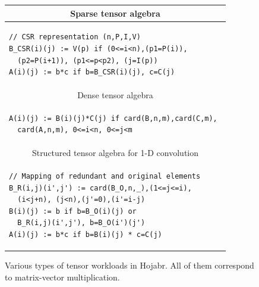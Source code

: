 \begin{figure}[t!]
\begin{tabular}{|l|}
\hline 
\multicolumn{1}{|c|}{Sparse tensor algebra} \\ \hline \hline
\begin{lstlisting}
// CSR representation (n,P,I,V)
B_CSR(i)(j) := V(p) if (0<=i<n),(p1=P(i)),
  (p2=P(i+1)), (p1<=p<p2), (j=I(p))
A(i)(j) := b*c if b=B_CSR(i)(j), c=C(j)
\end{lstlisting} \\ \hline \hline \hline
\multicolumn{1}{|c|}{Dense tensor algebra} \\ \hline \hline
\begin{lstlisting}
A(i)(j) := B(i)(j)*C(j) if card(B,n,m),card(C,m), 
  card(A,n,m), 0<=i<n, 0<=j<m
\end{lstlisting} \\ \hline \hline \hline
\multicolumn{1}{|c|}{Structured tensor algebra for 1-D convolution} \\ \hline \hline
\begin{lstlisting}
// Mapping of redundant and original elements 
B_R(i,j)(i',j') := card(B_O,n,_),(1<=j<=i), 
  (i<j+n), (j<n),(j'=0),(i'=i-j)
B(i)(j) := b if b=B_O(i)(j) or 
  B_R(i,j)(i',j'), b=B_O(i')(j')
A(i)(j) := b*c if b=B(i)(j) * c=C(j)
\end{lstlisting}
\\ \hline
\end{tabular}
\caption{Various types of tensor workloads in Hojabr. All of them correspond to matrix-vector multiplication.}
\label{fig:tensor}
\end{figure}